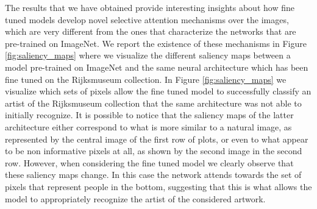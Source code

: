 The results that we have obtained provide interesting insights about how fine tuned models develop novel selective attention mechanisms over the images, which are very different from the ones that characterize the networks that are pre-trained on ImageNet. We report the existence of these mechanisms in Figure \ref{fig:saliency_maps} where we visualize the different saliency maps between a model pre-trained on ImageNet and the same neural architecture which has been fine tuned on the Rijksmuseum collection. In Figure \ref{fig:saliency_maps} we visualize which sets of pixels allow the fine tuned model to successfully classify an artist of the Rijksmuseum collection that the same architecture was not able to initially recognize. It is possible to notice that the saliency maps of the latter architecture either correspond to what is more similar to a natural image, as represented by the central image of the first row of plots, or even to what appear to be non informative pixels at all, as shown by the second image in the second row. However, when considering the fine tuned model we clearly observe that these saliency maps change. In this case the network attends towards the set of pixels that represent people in the bottom, suggesting that this is what allows the model to appropriately recognize the artist of the considered artwork.

